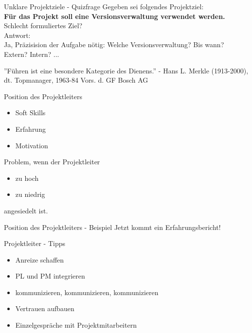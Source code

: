 \documentclass[12pt]{beamer}
\begin{document}
	\begin{frame}{Unklare Projektziele - Quizfrage}
		Gegeben sei folgendes Projektziel:\\
		\textbf{Für das Projekt soll eine Versionsverwaltung verwendet werden.} \\
		Schlecht formuliertes Ziel? \\
		Antwort: \\
		Ja, Präzisision der Aufgabe nötig: Welche Versionsverwaltung? Bis wann? Extern? Intern? ... 
	\end{frame}

	\thispagestyle{empty}
	\begin{frame}
		''Führen ist eine besondere Kategorie des Dienens.'' - Hans L. Merkle (1913-2000), dt. Topmanager, 1963-84 Vors. d. GF Bosch AG
	\end{frame}

	\begin{frame}{Position des Projektleiters}
		\begin{itemize}
			\item{Soft Skills}
			\item{Erfahrung}
			\item{Motivation}
		\end{itemize}

		Problem, wenn der Projektleiter
		\begin{itemize}
			\item{zu hoch}
			\item{zu niedrig} 
		\end{itemize}
		angesiedelt ist.
		
	\end{frame}

	\begin{frame}{Position des Projektleiters - Beispiel}
		Jetzt kommt ein Erfahrungsbericht!
	\end{frame}

	\begin{frame}{Projektleiter - Tipps}
		\begin{itemize}
			\item{Anreize schaffen}
			\item{PL und PM integrieren}
			\item{kommunizieren, kommunizieren, kommunizieren}
			\item{Vertrauen aufbauen}
			\item{Einzelgespräche mit Projektmitarbeitern}
		\end{itemize}

	\end{frame}
\end{document}
